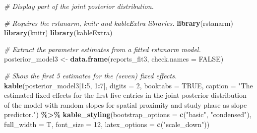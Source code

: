 \documentclass[
  english,
  doc]{apa6}
\newenvironment{Shaded}{\begin{snugshade}}{\end{snugshade}}
\newcommand{\CommentTok}[1]{\textcolor[rgb]{0.56,0.35,0.01}{\textit{#1}}}
\newcommand{\DataTypeTok}[1]{\textcolor[rgb]{0.13,0.29,0.53}{#1}}
\newcommand{\DecValTok}[1]{\textcolor[rgb]{0.00,0.00,0.81}{#1}}
\newcommand{\KeywordTok}[1]{\textcolor[rgb]{0.13,0.29,0.53}{\textbf{#1}}}
\newcommand{\NormalTok}[1]{#1}
\newcommand{\OperatorTok}[1]{\textcolor[rgb]{0.81,0.36,0.00}{\textbf{#1}}}
\newcommand{\OtherTok}[1]{\textcolor[rgb]{0.56,0.35,0.01}{#1}}
\newcommand{\StringTok}[1]{\textcolor[rgb]{0.31,0.60,0.02}{#1}}
\begin{document}
\begin{Shaded}
\begin{Highlighting}[]
\CommentTok{\# Display part of the joint posterior distribution.}

\CommentTok{\# Requires the rstanarm, knitr and kableExtra libraries.}
\KeywordTok{library}\NormalTok{(rstanarm)}
\KeywordTok{library}\NormalTok{(knitr)}
\KeywordTok{library}\NormalTok{(kableExtra)}

\CommentTok{\# Extract the parameter estimates from a fitted rstanarm model.}
\NormalTok{posterior\_model3 \textless{}{-}}\StringTok{ }\KeywordTok{data.frame}\NormalTok{(reports\_fit3, }\DataTypeTok{check.names =} \OtherTok{FALSE}\NormalTok{)}

\CommentTok{\# Show the first 5 estimates for the (seven) fixed effects.}
\KeywordTok{kable}\NormalTok{(posterior\_model3[}\DecValTok{1}\OperatorTok{:}\DecValTok{5}\NormalTok{, }\DecValTok{1}\OperatorTok{:}\DecValTok{7}\NormalTok{], }\DataTypeTok{digits =} \DecValTok{2}\NormalTok{, }\DataTypeTok{booktabs =} \OtherTok{TRUE}\NormalTok{,}
      \DataTypeTok{caption =} \StringTok{"The estimated fixed effects for the first five entries }
\StringTok{      in the joint posterior distribution of the model with random slopes }
\StringTok{      for spatial proximity and study phase as slope predictor."}\NormalTok{) }\OperatorTok{\%\textgreater{}\%}
\StringTok{  }\KeywordTok{kable\_styling}\NormalTok{(}\DataTypeTok{bootstrap\_options =} \KeywordTok{c}\NormalTok{(}\StringTok{"basic"}\NormalTok{, }\StringTok{"condensed"}\NormalTok{), }
                \DataTypeTok{full\_width =}\NormalTok{ T, }\DataTypeTok{font\_size =} \DecValTok{12}\NormalTok{, }
                \DataTypeTok{latex\_options =} \KeywordTok{c}\NormalTok{(}\StringTok{"scale\_down"}\NormalTok{))}
\end{Highlighting}
\end{Shaded}

\begin{table}

\caption{\label{tab:jointposterior}The estimated fixed effects for the first five entries 
      in the joint posterior distribution of the model with random slopes 
      for spatial proximity and study phase as slope predictor.}
\centering
{}
\end{table}
\end{document}

